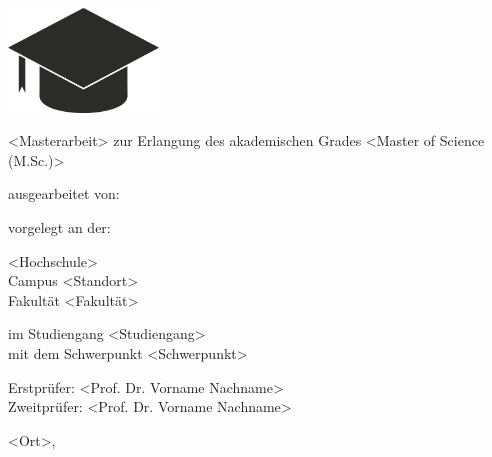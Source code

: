 \begin{titlepage}
\begin{singlespace}

\includegraphics[width=0.3\textwidth, right]{decorative/University_Logo.png}

\vspace{6cm}

{\huge \bfseries \TITLE}

\vspace{0.5cm}

<Masterarbeit> zur Erlangung des akademischen Grades <Master of Science (M.Sc.)>

\vspace{2cm}

ausgearbeitet von:

\AUTHOR

\vspace{1cm}

vorgelegt an der:

<Hochschule>\\
Campus <Standort>\\
Fakultät <Fakultät>

im Studiengang <Studiengang>\\
mit dem Schwerpunkt <Schwerpunkt>

\vspace{1cm}

Erstprüfer: <Prof. Dr. Vorname Nachname>\\
Zweitprüfer: <Prof. Dr. Vorname Nachname>

\vspace{1cm}

<Ort>, \DATE

\end{singlespace}
\end{titlepage}
